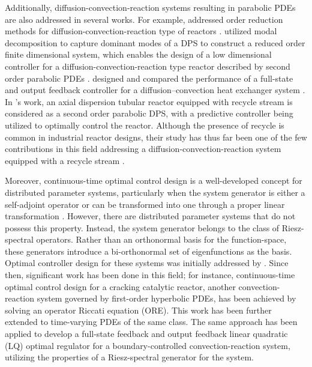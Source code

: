 Additionally, diffusion-convection-reaction systems resulting in parabolic PDEs are also addressed in several works. For example,  addressed order reduction methods for diffusion-convection-reaction type of reactors \autocite{Christofides2012Nonlinear}.  utilized modal decomposition to capture dominant modes of a DPS to construct a reduced order finite dimensional system, which enables the design of a low dimensional controller for a diffusion-convection-reaction type reactor described by second order parabolic PDEs \autocite{Dubljevic2006Predictivea}.  designed and compared the performance of a full-state and output feedback controller for a diffusion--convection heat exchanger system \autocite{Cassol2019Heat}. In 's work, an axial dispersion tubular reactor equipped with recycle stream is considered as a second order parabolic DPS, with a predictive controller being utilized to optimally control the reactor.  Although the presence of recycle is common in industrial reactor designs, their study has thus far been one of the few contributions in this field addressing a diffusion-convection-reaction system equipped with a recycle stream \autocite{Khatibi2021Model}.

Moreover, continuous-time optimal control design is a well-developed concept for distributed parameter systems, particularly when the system generator is either a self-adjoint operator or can be transformed into one through a proper linear transformation \autocite{Morris2020Controller}. However, there are distributed parameter systems that do not possess this property. Instead, the system generator belongs to the class of Riesz-spectral operators. Rather than an orthonormal basis for the function-space, these generators introduce a bi-orthonormal set of eigenfunctions as the basis. Optimal controller design for these systems was initially addressed by  \autocite{Curtain2020Introduction}. Since then, significant work has been done in this field; for instance, continuous-time optimal control design for a cracking catalytic reactor, another convection-reaction system governed by first-order hyperbolic PDEs, has been achieved by solving an operator Riccati equation (ORE)\autocite{Aksikas2013Optimal}. This work has been further extended to time-varying PDEs of the same class\autocite{Aksikas2013Optimal}. The same approach has been applied to develop a full-state feedback\autocite{Mohammadi2012LQ} and output feedback\autocite{Aksikas2024Spectral} linear quadratic (LQ) optimal regulator for a boundary-controlled convection-reaction system, utilizing the properties of a Riesz-spectral generator for the system.

